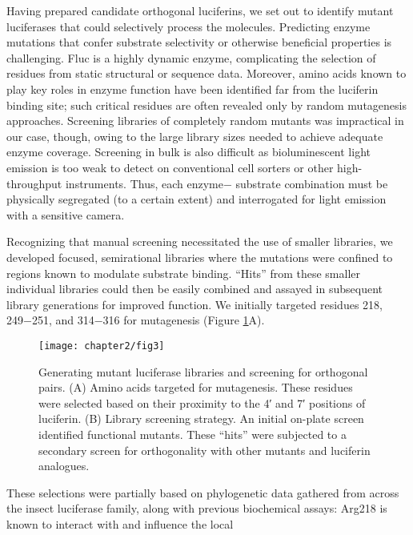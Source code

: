Having prepared
candidate orthogonal luciferins, we set out to identify
mutant luciferases that could selectively process the molecules.
Predicting enzyme mutations that confer substrate selectivity or
otherwise beneficial properties is challenging. Fluc is a highly
dynamic enzyme,\cite{RN107, Mao:2011bi} complicating the selection of residues
from static structural or sequence data. Moreover, amino acids
known to play key roles in enzyme function have been
identified far from the luciferin binding site;\cite{AdamsJr:2016bn} such critical
residues are often revealed only by random mutagenesis
approaches.\cite{Chen:2012bb, Reetz:2010dv} Screening libraries of completely random
mutants was impractical in our case, though, owing to the
large library sizes needed to achieve adequate enzyme
coverage.\cite{Reetz:2010dv} Screening in bulk is also difficult as bioluminescent
light emission is too weak to detect on conventional cell sorters
or other high-throughput instruments. Thus, each enzyme−
substrate combination must be physically segregated (to a
certain extent) and interrogated for light emission with a
sensitive camera.
\par
Recognizing that manual screening necessitated the use of
smaller libraries, we developed focused, semirational libraries
where the mutations were confined to regions known to
modulate substrate binding.\cite{Kille:2012dt} “Hits” from these smaller
individual libraries could then be easily combined and assayed
in subsequent library generations for improved function. We
initially targeted residues 218, 249−251, and 314−316 for
mutagenesis (Figure \ref{fig:residues_screening}A).
\begin{figure}[htbp]
\texttt{[image: chapter2/fig3]}
\centering
\caption[Generating mutant luciferase libraries and screening for orthogonal pairs]{Generating mutant luciferase libraries and screening for orthogonal pairs. (A) Amino acids targeted for mutagenesis. These residues were
selected based on their proximity to the 4′ and 7′ positions of luciferin. (B) Library screening strategy. An initial on-plate screen identified functional
mutants. These “hits” were subjected to a secondary screen for orthogonality with other mutants and luciferin analogues.}
  \label{fig:residues_screening}
\end{figure}
These selections were partially based on phylogenetic data gathered from across the insect luciferase
family,\cite{RN45, Amaral:2014cz} along with previous biochemical assays: Arg218 is
known to interact with \dluciferin{} and influence the local
